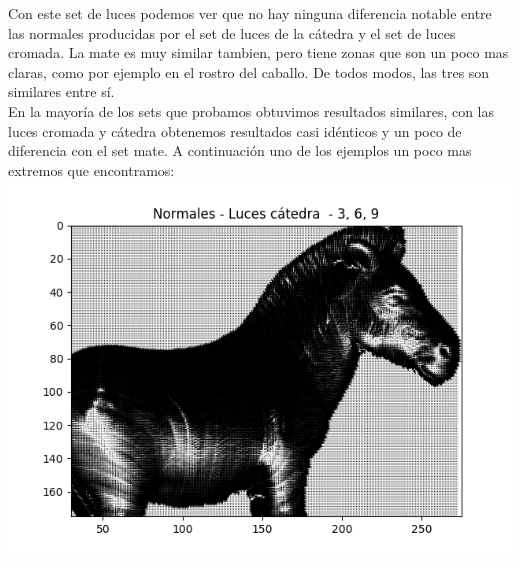 Con este set de luces podemos ver que no hay ninguna diferencia notable entre las normales producidas por el set de luces de la cátedra y el set de luces cromada. La mate es muy similar tambien, pero tiene zonas que son un poco mas claras, como por ejemplo en el rostro del caballo. De todos modos, las tres son similares entre sí. \\



En la mayoría de los sets que probamos obtuvimos resultados similares, con las luces cromada y cátedra obtenemos resultados casi idénticos y un poco de diferencia con el set mate. A continuación uno de los ejemplos un poco mas extremos que encontramos: \\

{\centering
    \includegraphics[scale=0.5]{informe/imagenes/normales/normalesLucesCatedra369.png}
}

